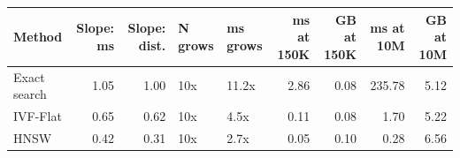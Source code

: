 \begin{tabular}{lrrllrrrr}
\toprule
Method & Slope: ms & Slope: dist. & N grows & ms grows & ms at 150K & GB at 150K & ms at 10M & GB at 10M \\
\midrule
Exact search & 1.05 & 1.00 & 10x & 11.2x & 2.86 & 0.08 & 235.78 & 5.12 \\
IVF-Flat & 0.65 & 0.62 & 10x & 4.5x & 0.11 & 0.08 & 1.70 & 5.22 \\
HNSW & 0.42 & 0.31 & 10x & 2.7x & 0.05 & 0.10 & 0.28 & 6.56 \\
\bottomrule
\end{tabular}
